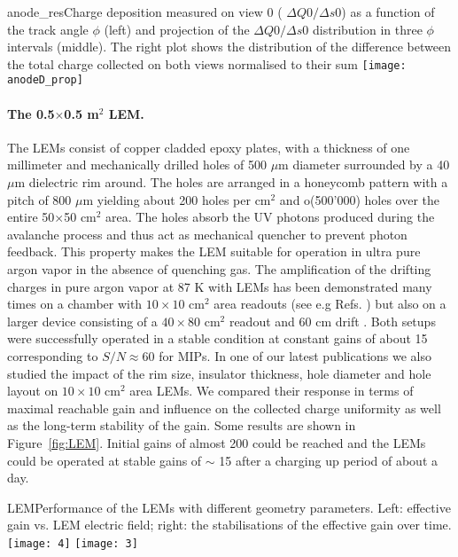 \begin{cdrfigure}{anode_res}{Charge deposition measured on view 0 ( $\Delta Q0/\Delta s0$) as a function  of the track angle $\phi$ (left) and projection of the  $\Delta Q0/\Delta s0$ distribution in three $\phi$ intervals (middle). The right plot  shows the distribution of the difference between the total charge  collected on both views normalised to their sum}
\texttt{[image: anodeD\_prop]}
\end{cdrfigure}

\paragraph{The 0.5$\times$0.5 m$^2$ LEM.}

The LEMs consist of copper cladded epoxy plates, with a thickness of one millimeter and mechanically drilled holes of 500 $\mu$m diameter
surrounded by a 40 $\mu$m dielectric rim around. The holes are arranged in a honeycomb pattern with a pitch of 800 $\mu$m yielding
about 200 holes per cm$^2$ and o(500'000) holes over the entire 50$\times$50 cm$^2$ area. The holes absorb the UV photons produced during the
avalanche process and thus act as mechanical quencher to prevent photon feedback. This property makes the LEM suitable for operation in
ultra pure argon vapor in the absence of quenching gas.  The amplification of the drifting charges in pure argon vapor at 87 K with
LEMs has been demonstrated many times on a chamber with $10\times10$ cm$^2$ area readouts (see e.g
Refs. \cite{Badertscher:2008rf,Badertscher:2010fi} ) but also on a larger device consisting of a $40\times80$ cm$^2$ readout and 60 cm
drift \cite{Badertscher:2013wm}.  Both setups were successfully operated in a stable condition at constant gains of about 15
corresponding to $S/N\approx 60$ for MIPs. In one of our latest publications \cite{Cantini:2014xza} we also studied the impact of the
rim size, insulator thickness, hole diameter and hole layout on $10\times10$ cm$^2$ area LEMs. We compared their response in terms of
maximal reachable gain and influence on the collected charge uniformity as well as the long-term stability of the gain. Some
results are shown in Figure~\ref{fig:LEM}.  Initial gains of almost 200 could be reached and the LEMs could be operated at stable gains of
$\sim$ 15 after a charging up period of about a day.

\begin{cdrfigure}{LEM}{Performance of the LEMs with different geometry
      parameters. Left: effective gain vs. LEM electric field; right:
      the stabilisations of the effective gain over time.}
     \texttt{[image: 4]}
    \texttt{[image: 3]}
\end{cdrfigure}


